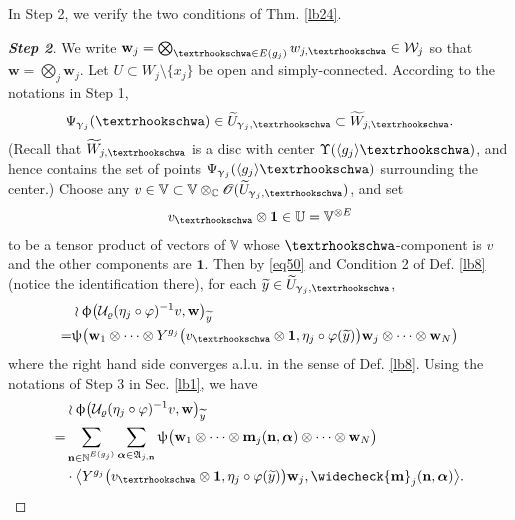 \documentclass[12pt,a4paper,notitlepage]{article}
\theoremstyle{definition}
\theoremstyle{plain}
\newcommand{\fk}{\mathfrak}
\newcommand{\mc}{\mathcal}
\newcommand{\wtd}{\widetilde}
\newcommand{\wch}{\widecheck}
\newcommand{\id}{\mathbf{1}}
\newcommand{\bk}[1]{\langle {#1}\rangle}
\newcommand{\scr}{\mathscr}
\newcommand{\mbf}{\mathbf}
\newcommand{\bsb}{\boldsymbol}
\newcommand{\Vbb}{\mathbb V}
\newcommand{\Ubb}{\mathbb U}
\newcommand{\Cbb}{\mathbb C}
\newcommand{\Nbb}{\mathbb N}
\newcommand{\wbf}{\mathbf w}
\newcommand{\tipae}{\text{\textrhookschwa}}
\numberwithin{equation}{subsection}
\begin{document}
In Step 2, we verify the two conditions of Thm. \ref{lb24}.


\begin{proof}[\textbf{Step 2}]

We write $\wbf_j=\bigotimes_{\tipae\in E(g_j)}w_{j,\tipae}\in\mc W_j$ so that $\wbf=\bigotimes_j\wbf_j$. Let $U\subset W_j\setminus\{x_j\}$ be open and simply-connected. According to the notations in Step 1, 
\begin{align*}
\Psi_{\upgamma_j}(\tipae)\in\wtd U_{\upgamma_j,\tipae}\subset\wtd W_{j,\tipae}.	
\end{align*} 
(Recall that $\wtd W_{j,\tipae}$ is a disc with center $\Upsilon(\bk{g_j}\tipae)$, and hence contains the set of points $\Psi_{\upgamma_j}(\bk{g_j}\tipae)$ surrounding the center.) Choose any $v\in\Vbb\subset\Vbb\otimes_\Cbb\scr O(\wtd U_{\upgamma_j,\tipae})$, and set
\begin{align*}
v_\tipae\otimes\id\in\Ubb=\Vbb^{\otimes E}	
\end{align*}
to be a tensor product of vectors of $\Vbb$ whose $\tipae$-component is $v$ and the other components are $\id$. Then by \eqref{eq50} and Condition 2 of Def. \ref{lb8} (notice the identification there), for each $\wtd y\in\wtd U_{\upgamma_j,\tipae}$,
\begin{align*}
&\wr\upphi\big(\mc U_\varrho(\eta_j\circ\varphi)^{-1}v,\wbf\big)_{\wtd y}\\
=&\uppsi\big(\wbf_1\otimes\cdots\otimes Y^{g_j}\big(v_\tipae\otimes\id,\eta_j\circ\varphi(\wtd y)\big)\wbf_j\otimes\cdots\otimes\wbf_N \big)	
\end{align*}
where the right hand side converges a.l.u. in the sense of Def. \ref{lb8}. Using the notations of Step 3 in Sec. \ref{lb1}, we have
\begin{align*}
&\wr\upphi\big(\mc U_\varrho(\eta_j\circ\varphi)^{-1}v,\wbf\big)_{\wtd y}\\
=&\sum_{\mbf n\in\Nbb^{E(g_j)}}\sum_{\bsb\alpha\in\fk A_{j,\mbf n}}\uppsi\big(\wbf_1\otimes\cdots\otimes \mbf m_j(\mbf n,\bsb\alpha)\otimes\cdots\otimes\wbf_N \big)\nonumber\\
&\cdot \big\langle Y^{g_j}\big(v_\tipae\otimes\id,\eta_j\circ\varphi(\wtd y)\big)\wbf_j,\wch{\mbf m}_j(\mbf n,\bsb\alpha)\big\rangle.	
\end{align*}



\end{proof}
\end{document}
